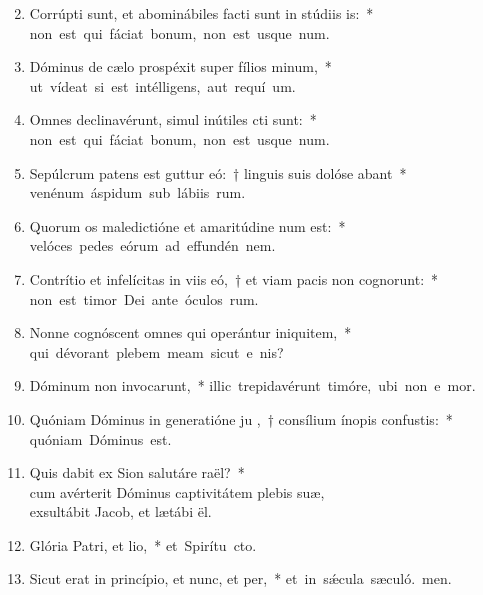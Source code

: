 \begin{flushleft}
\begin{enumerate}[leftmargin=*]
\setcounter{enumi}{1}
\item Corrúpti sunt, et abominábiles facti sunt in stúdiis is:~* \mbox{non est qui fáciat bonum, non est usque  num.}
\item Dóminus de cælo prospéxit super fílios minum,~* \mbox{ut vídeat si est intélligens, aut requí um.}
\item Omnes declinavérunt, simul inútiles cti sunt:~* \mbox{non est qui fáciat bonum, non est usque  num.}
\item Sepúlcrum patens est guttur eó:~† linguis suis dolóse abant~* \mbox{venénum áspidum sub lábiis rum.}
\item Quorum os maledictióne et amaritúdine num est:~* \mbox{velóces pedes eórum ad effundén nem.}
\item Contrítio et infelícitas in viis eó,~† et viam pacis non cognorunt:~* \mbox{non est timor Dei ante óculos rum.}
\item Nonne cognóscent omnes qui operántur iniquitem,~* \mbox{qui dévorant plebem meam sicut e nis?}
\item Dóminum non invocarunt,~* \mbox{illic trepidavérunt timóre, ubi non e mor.}
\item Quóniam Dóminus in generatióne ju ,~† consílium ínopis confustis:~* \mbox{quóniam Dóminus   est.}
\item \sloppy Quis dabit ex Sion salutáre raël?~* \\cum avérterit Dóminus captivitátem plebis suæ, \\exsultábit Jacob, et lætábi ël.
\item Glória Patri, et lio,~* \mbox{et Spirítu cto.}
\item Sicut erat in princípio, et nunc, et per,~* \mbox{et in s\'{\ae}cula sæculó. men.}
\end{enumerate}
\end{flushleft}

